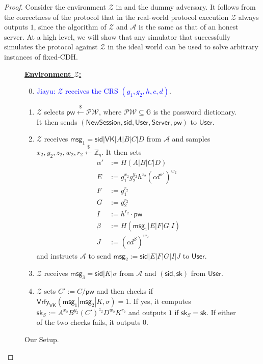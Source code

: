 \documentclass[12pt,a4paper]{article}
\newcommand{\env}{\mathcal{Z}}
\newcommand{\adv}{\mathcal{A}}
\newcommand{\user}{\mathsf{User}}
\newcommand{\sk}{\mathsf{sk}}
\newcommand{\pw}{\mathsf{pw}}
\newcommand{\newsession}{\mathsf{NewSession}}
\newcommand{\server}{\mathsf{Server}}
\newcommand{\msg}[1]{\mathsf{msg}_{#1}}
\def\xjy#1{\textcolor{blue}{Jiayu: #1}}
\begin{document}
	\begin{proof}
	
	Consider the environment $\env$ in  and the dummy adversary. It follows from the correctness of the protocol that in the real-world protocol execution $\env$ always outputs $1$, since the algorithm of $\env$ and $\adv$ is the same as that of an honest server. At a high level, we will show that any simulator that successfully simulates the protocol against $\env$ in the ideal world can be used to solve arbitrary instances of fixed-CDH.\\
	
	\begin{figure}[h]
		\begin{framed}
			\vspace{2mm}
			\textbf{\underline{Environment $\env$:}}
			\begin{enumerate}\setcounter{enumi}{-1}
                \item \xjy{$\env$ receives the CRS $(g_1, g_2, h, c, d)$}.
				\item $\env$ selects $\pw\xleftarrow{\$}\mathcal{PW}$, where $\mathcal{PW}\subseteq\mathbb{G}$ is the password dictionary. It then sends $(\newsession,\mathsf{sid},\user,\server,\pw)$ to $\user$.
				\item $\env$ receives $\msg{1} = \mathsf{sid}|\mathsf{VK}|A|B|C|D$ from $\adv$ and samples $x_2, y_2, z_2, w_2, r_2\xleftarrow{\$}\mathbb{Z}_q$. It then sets 
				\begin{align*}
					\alpha'&:=H(A|B|C|D)\\
					E &:= g_1^{x_2}g_2^{y_2}h^{z_2}(cd^{\alpha'})^{w_2}\\
					F &:= g_1^{r_2}\\
					G &:= g_2^{r_2}\\
					I &:= h^{r_2}\cdot\pw\\
					\beta &:= H(\msg{1}|E|F|G|I)\\
					J &:= (cd^{\beta})^{w_2}
				\end{align*}
			and instructs $\adv$ to send $\msg{2} := \mathsf{sid}|E|F|G|I|J$ to $\user$. 
			\item $\env$ receives $\msg{3}=\mathsf{sid}|K|\sigma$ from $\adv$ and $(\mathsf{sid}, \sk)$ from $\user$.
			\item $\env$ sets $C':=C/\pw$ and then checks if $\mathsf{Vrfy}_{\mathsf{VK}}(\msg{1}|\msg{2}|K,\sigma)=1$. If yes, it computes $\sk_S:=A^{x_2}B^{y_2}(C')^{z_2}D^{w_2}K^{r_2}$ and outputs $1$ if $\sk_S=\sk$. If either of the two checks fails, it outputs $0$.
			\end{enumerate}
			\vspace{2mm}
		\end{framed}
		\caption{Our Setup.}
		\label{fig:adv}
	\end{figure}


\end{proof}
\end{document}
